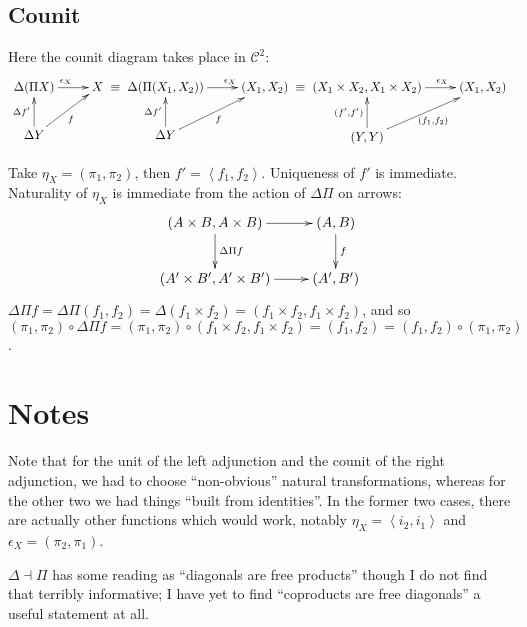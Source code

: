 \documentclass[letterpaper]{article}
\newcommand{\ang}[1]{\left\langle{#1}\right\rangle}
\begin{document}
\subsection{Counit}

Here the counit diagram takes place in $\mathcal{C}^2$:
\[ \xymatrix{
	\Delta (\Pi X) \ar[r]^{\epsilon_X} & X \\
    \Delta Y \ar[u]^{\Delta f'} \ar[ur]_{f}
} \equiv \xymatrix {
	\Delta (\Pi (X_1,X_2)) \ar[r]^(.65){\epsilon_X} & (X_1, X_2) \\
    \Delta Y \ar[u]^{\Delta f'} \ar[ur]_{f}
} \equiv \xymatrix {
	(X_1 \times X_2, X_1 \times X_2) \ar[r]^(.65){\epsilon_X} & (X_1, X_2) \\
    (Y,Y) \ar[u]^{(f',f')} \ar[ur]_{(f_1,f_2)}
}  \]

Take $\eta_X = (\pi_1, \pi_2)$, then $f' = \ang{f_1, f_2}$.  Uniqueness of
$f'$ is immediate.  Naturality of $\eta_X$ is immediate from the action of
$\Delta\Pi$ on arrows:
\[ \xymatrix{
	(A \times B, A \times B) \ar[r] \ar[d]^{\Delta \Pi f} & (A, B) \ar[d]^{f} \\
	(A' \times B', A' \times B') \ar[r] & (A', B')
} \]
$\Delta \Pi f = \Delta \Pi (f_1,f_2) = \Delta (f_1 \times f_2) = (f_1 \times
f_2, f_1 \times f_2)$, and so
$(\pi_1, \pi_2) \circ \Delta \Pi f = (\pi_1, \pi_2) \circ (f_1 \times
f_2, f_1 \times f_2) = (f_1, f_2) = (f_1,f_2) \circ (\pi_1, \pi_2)$.

\section{Notes}

Note that for the unit of the left adjunction and the counit of the right
adjunction, we had to choose ``non-obvious'' natural transformations,
whereas for the other two we had things ``built from identities''.  In the
former two cases, there are actually other functions which would work,
notably $\eta_X = \ang{i_2, i_1}$ and $\epsilon_X = (\pi_2,\pi_1)$.

$\Delta \dashv \Pi$ has some reading as ``diagonals are free products''
though I do not find that terribly informative; I have yet to find
``coproducts are free diagonals'' a useful statement at all.
\end{document}
